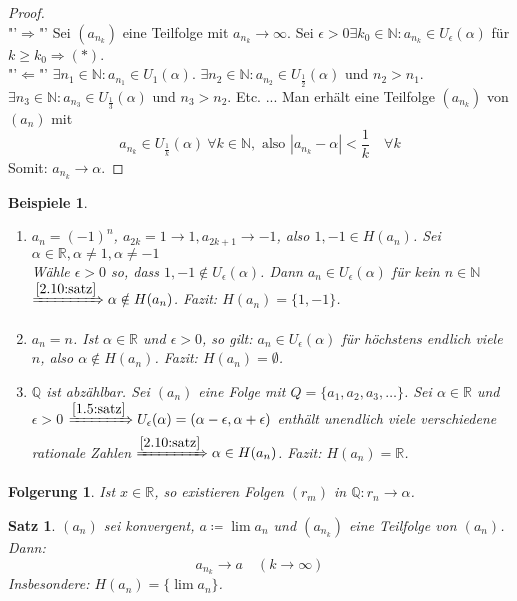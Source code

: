 \documentclass[titlepage,ngerman,a4paper,headsepline]{scrartcl}
\newcommand{\N}{\mathbb{N}}
\newcommand{\Q}{\mathbb{Q}}
\newcommand{\R}{\mathbb{R}}
\theoremstyle{named}
\theoremstyle{dotless}
\newtheorem{satz}[namedtheorem]{Satz}
\newtheorem*{beispiele}{Beispiele}
\newtheorem*{folgerung*}{Folgerung}
\begin{document}
\begin{proof} ~\\
	"'$\Rightarrow$"' Sei $(a_{n_{k}})$ eine Teilfolge mit $a_{n_{k}} \rightarrow \infty$. Sei $\epsilon > 0 \exists k_{0} \in \N: a_{n_{k}} \in U_{\epsilon}(\alpha)$ für $k \geq k_{0} \Rightarrow (*)$. \\
	"'$\Leftarrow$"' $\exists n_{1} \in \N: a_{n_{1}} \in U_{1}(\alpha)$. $\exists n_{2} \in \N: a_{n_{2}} \in U_{\frac{1}{2}}(\alpha)$ und $n_{2} > n_{1}$. $\exists n_{3} \in \N: a_{n_{3}} \in U_{\frac{1}{3}}(\alpha)$ und $n_{3} > n_{2}$. Etc. ... Man erhält eine Teilfolge $(a_{n_{k}})$ von $(a_{n})$ mit
	$$
		a_{n_{k}} \in U_{\frac{1}{k}}(\alpha) ~\forall k \in \N, \text{ also } |a_{n_{k}} - \alpha| < \frac{1}{k} \quad \forall k
	$$
	Somit: $a_{n_{k}} \rightarrow \alpha$. 
\end{proof}


\begin{beispiele}\
	\begin{enumerate}
		\item $a_{n} = (-1)^{n}$, $a_{2k} = 1 \rightarrow 1, a_{2k+1} \rightarrow -1$, also $1, -1 \in H(a_{n})$. Sei $\alpha \in \R, \alpha \neq 1, \alpha \neq -1$ \\
			Wähle $\epsilon>0$ so, dass $1, -1 \notin U_{\epsilon}(\alpha)$. Dann $a_{n} \in U_{\epsilon}(\alpha)$ für kein $n \in \N$ $\xRightarrow[]{\ref{2.10:satz}} \alpha \notin H(a_{n})$. Fazit: $H(a_{n}) = \{ 1, -1 \}$.
		\item $a_{n} = n$. Ist $\alpha \in \R$ und $\epsilon > 0$, so gilt: $a_{n} \in U_{\epsilon}(\alpha)$ für höchstens endlich viele $n$, also $\alpha \notin H(a_{n})$. Fazit: $H(a_{n}) = \emptyset$.
		\item $\Q$ ist abzählbar. Sei $(a_{n})$ eine Folge mit $Q = \{ a_{1}, a_{2}, a_{3}, \dotsc \}$. Sei $\alpha \in \R$ und $\epsilon > 0$ $\xRightarrow[]{\ref{1.5:satz}} U_{\epsilon}(\alpha) = (\alpha - \epsilon, \alpha + \epsilon)$ enthält unendlich viele verschiedene rationale Zahlen $\xRightarrow[]{\ref{2.10:satz}} \alpha \in H(a_{n})$. Fazit: $H(a_{n}) = \R$.
	\end{enumerate}	
\end{beispiele}

\begin{folgerung*}
Ist $x \in \R$, so existieren Folgen $(r_{m})$ in $\Q : r_{n} \rightarrow \alpha$.	
\end{folgerung*}


\begin{satz} \label{2.11:satz} 
	$(a_{n})$ sei konvergent, $a \coloneqq \lim a_{n}$ und $(a_{n_{k}})$ eine Teilfolge von $(a_{n})$. Dann:
	$$ a_{n_{k}} \rightarrow a \quad (k \rightarrow \infty) $$
	Insbesondere: $H(a_{n}) = \{ \lim a_{n} \}$.
\end{satz}
\end{document}
